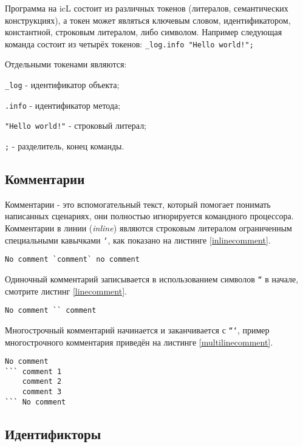 \documentclass[a4paper, 14pt]{extarticle}
\begin{document}
	Программа на icL состоит из различных токенов (литералов, семантических конструкциях), а токен может являться ключевым словом, идентификатором, константной, строковым литералом, либо символом. Например следующая команда состоит из четырёх токенов: \lstinline`_log.info "Hello world!";`
	
	Отдельными токенами являются:
	\begin{list}{•}{}
	\item \lstinline`_log` - идентификатор объекта;
	\item \lstinline`.info` - идентификатор метода;
	\item \lstinline`"Hello world!"` - строковый литерал;
	\item \lstinline`;` - разделитель, конец команды.
	\end{list}
	
	\subsection{Комментарии}
	
	Комментарии - это вспомогательный текст, который помогает понимать написанных сценариях, они полностью игнорируется командного процессора. Комментарии в линии (\textit{inline}) являются строковым литералом ограниченным специальными кавычками \texttt{`}, как показано на листинге \ref{inlinecomment}.
	
	\begin{lstlisting}[caption=Комментарий в линии,
						   label=inlinecomment]
No comment `comment` no comment
	\end{lstlisting}
	
	Одиночный комментарий записывается в использованием символов \texttt{``} в начале, смотрите листинг \ref{linecomment}.
	
	\begin{lstlisting}[caption=Одиночный комментарий,
						   label=linecomment]
No comment `` comment
	\end{lstlisting}
	
	Многострочный комментарий начинается и заканчивается с \texttt{```}, пример многострочного комментария приведён на листинге \ref{multilinecomment}.
	
	\begin{lstlisting}[caption=Многострочный комментарий,
						   label=multilinecomment]
No comment
``` comment 1
	comment 2
	comment 3
``` No comment
	\end{lstlisting}
	
	\subsection{Идентификторы}
	
\end{document}
